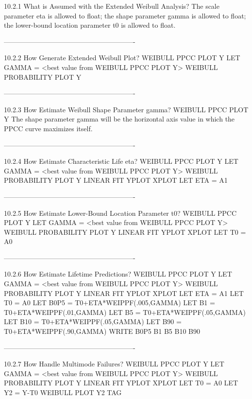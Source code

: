 10.2.1
What is Assumed with the Extended Weibull Analysis?
      The scale parameter eta is allowed to float;
      the shape parameter gamma is allowed to float;
      the lower-bound location parameter t0 is allowed to float.
 
----------------------------------------------------------
 
10.2.2
How Generate Extended Weibull Plot?
      WEIBULL PPCC PLOT Y
      LET GAMMA = <best value from WEIBULL PPCC PLOT Y>
      WEIBULL PROBABILITY PLOT Y
 
----------------------------------------------------------
 
10.2.3
How Estimate Weibull Shape Parameter gamma?
      WEIBULL PPCC PLOT Y
      The shape parameter gamma will be the horizontal axis
      value in which the PPCC curve maximizes itself.
 
----------------------------------------------------------
 
10.2.4
How Estimate Characteristic Life eta?
      WEIBULL PPCC PLOT Y
      LET GAMMA = <best value from WEIBULL PPCC PLOT Y>
      WEIBULL PROBABILITY PLOT Y
      LINEAR FIT YPLOT XPLOT
      LET ETA = A1
 
----------------------------------------------------------
 
10.2.5
How Estimate Lower-Bound Location Parameter t0?
      WEIBULL PPCC PLOT Y
      LET GAMMA = <best value from WEIBULL PPCC PLOT Y>
      WEIBULL PROBABILITY PLOT Y
      LINEAR FIT YPLOT XPLOT
      LET T0 = A0
 
----------------------------------------------------------
 
10.2.6
How Estimate Lifetime Predictions?
      WEIBULL PPCC PLOT Y
      LET GAMMA = <best value from WEIBULL PPCC PLOT Y>
      WEIBULL PROBABILITY PLOT Y
      LINEAR FIT YPLOT XPLOT
      LET ETA = A1
      LET T0 = A0
      LET B0P5 = T0+ETA*WEIPPF(.005,GAMMA)
      LET B1 = T0+ETA*WEIPPF(.01,GAMMA)
      LET B5 = T0+ETA*WEIPPF(.05,GAMMA)
      LET B10 = T0+ETA*WEIPPF(.05,GAMMA)
      LET B90 = T0+ETA*WEIPPF(.90,GAMMA)
      WRITE B0P5 B1 B5 B10 B90
 
----------------------------------------------------------
 
10.2.7
How Handle Multimode Failures?
      WEIBULL PPCC PLOT Y
      LET GAMMA = <best value from WEIBULL PPCC PLOT Y>
      WEIBULL PROBABILITY PLOT Y
      LINEAR FIT YPLOT XPLOT
      LET T0 = A0
      LET Y2 = Y-T0
      WEIBULL PLOT Y2 TAG
 
